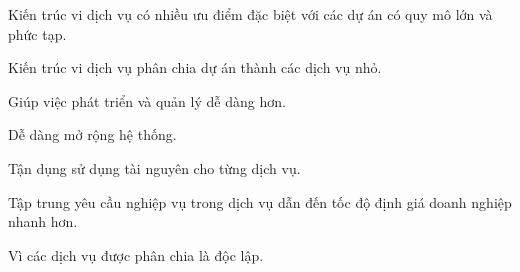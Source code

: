 









Kiến trúc vi dịch vụ có nhiều ưu điểm đặc biệt với các dự án có quy mô lớn và phức tạp.

Kiến trúc vi dịch vụ phân chia dự án thành các dịch vụ nhỏ.

Giúp việc phát triển và quản lý dễ dàng hơn.

Dễ dàng mở rộng hệ thống.

Tận dụng sử dụng tài nguyên cho từng dịch vụ.

Tập trung yêu cầu nghiệp vụ trong dịch vụ dẫn đến tốc độ định giá doanh nghiệp nhanh hơn.

Vì các dịch vụ được phân chia là độc lập.


